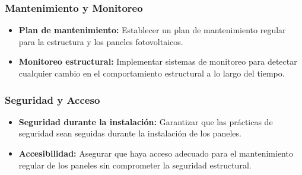 \documentclass{article}
\begin{document}
\subsubsection*{Mantenimiento y Monitoreo}
\begin{itemize}
    \item \textbf{Plan de mantenimiento:} Establecer un plan de mantenimiento regular para la estructura y los paneles fotovoltaicos.
    \item \textbf{Monitoreo estructural:} Implementar\cite{idaepctcon} sistemas de monitoreo para detectar cualquier cambio en el comportamiento estructural a lo largo del tiempo.
\end{itemize}

\subsubsection*{Seguridad y Acceso}
\begin{itemize}
    \item \textbf{Seguridad durante la instalación:} Garantizar que las prácticas de seguridad sean seguidas durante la instalación de los paneles.
    \item \textbf{Accesibilidad:} Asegurar que haya acceso adecuado para el mantenimiento regular de los paneles sin comprometer la seguridad estructural.
\end{itemize}



\ifdefined{} %
\else


\fi
\end{document}
